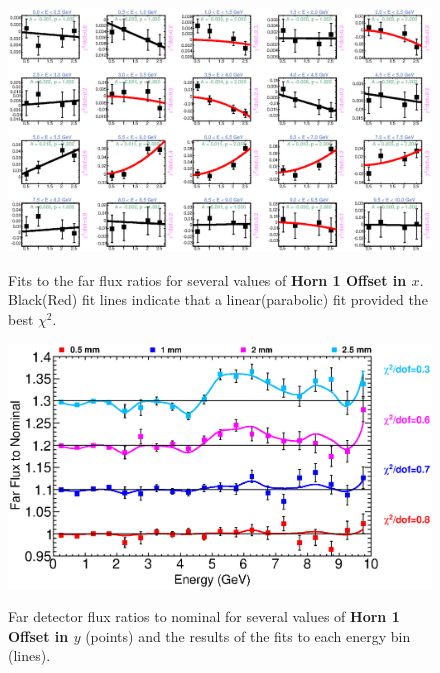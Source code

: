 {\begin{figure}[ht]
  \begin{center}
    {\includegraphics[width=5.0in]{figures/Horn1XOffset_far_fits.eps}}
  \end{center}
\caption{ Fits to the far flux ratios for several values of {\bf Horn 1 Offset in $x$}. Black(Red) fit lines indicate that a linear(parabolic) fit provided the best $\chi^2$. }
\end{figure}

\begin{figure}[ht]
  \begin{center}
    {\includegraphics[width=6.0in]{figures/Horn1YOffset_far_summary.eps}}
  \end{center}
\caption{ Far detector flux ratios to nominal for several values of {\bf Horn 1 Offset in $y$} (points) and the results of the fits to each energy bin (lines).}
\end{figure}

}
